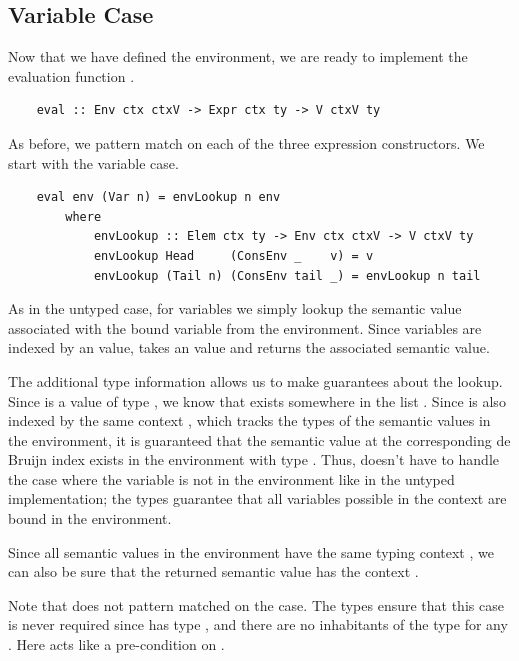 
\subsection{Variable Case}
\label{subsect:typedVarCase}

Now that we have defined the environment, we are ready to implement the evaluation function .

\begin{lstlisting}
    eval :: Env ctx ctxV -> Expr ctx ty -> V ctxV ty
\end{lstlisting}

As before, we pattern match on each of the three expression constructors. We start with the variable case.

\begin{lstlisting}
    eval env (Var n) = envLookup n env
        where
            envLookup :: Elem ctx ty -> Env ctx ctxV -> V ctxV ty 
            envLookup Head     (ConsEnv _    v) = v
            envLookup (Tail n) (ConsEnv tail _) = envLookup n tail
\end{lstlisting}

As in the untyped case, for variables we simply lookup the semantic value associated with the bound variable from the environment. Since variables are indexed by an  value,  takes an  value and returns the associated semantic value.

The additional type information allows us to make guarantees about the lookup. Since  is a value of type , we know that  exists somewhere in the list . Since  is also indexed by the same context , which tracks the types of the semantic values in the environment, it is guaranteed that the semantic value at the corresponding de Bruijn index exists in the environment with type . Thus,  doesn't have to handle the case where the variable is not in the environment like in the untyped implementation; the types guarantee that all variables possible in the context  are bound in the environment.

Since all semantic values in the environment have the same typing context , we can also be sure that the returned semantic value has the context .

Note that  does not pattern matched on the  case. The types ensure that this case is never required since  has type , and there are no inhabitants of the type  for any . Here  acts like a pre-condition on .

